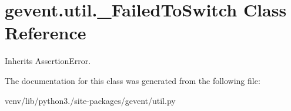 \hypertarget{classgevent_1_1util_1_1___failed_to_switch}{}\section{gevent.\+util.\+\_\+\+Failed\+To\+Switch Class Reference}
\label{classgevent_1_1util_1_1___failed_to_switch}


Inherits Assertion\+Error.



The documentation for this class was generated from the following file\+:\begin{DoxyCompactItemize}
\item 
venv/lib/python3./site-\/packages/gevent/util.\+py\end{DoxyCompactItemize}
